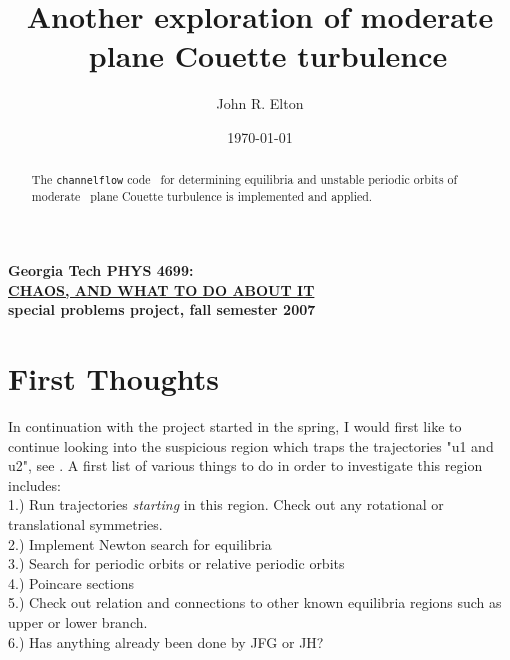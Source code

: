 \documentclass[pre,onecolumn,groupedaddress]{revtex4}
\begin{document}
                \title{
Another exploration of moderate \Reynolds\ plane Couette turbulence
                }\author{
John R. Elton            }
               \date{\today}


                \begin{abstract}
The {\tt channelflow} code~\cite{channelflow} for determining
equilibria and unstable periodic orbits of moderate \Reynolds\ plane
Couette turbulence is implemented and applied.

\end{abstract}
 
                    \maketitle

\noindent
{\bf Georgia Tech PHYS 4699:}\\
\underline{\bf CHAOS, AND WHAT TO DO ABOUT IT }\\
{\bf special problems project, fall semester 2007}


\section{First Thoughts}
In continuation with the project started in the spring, I would
first like to continue looking into the suspicious region which
traps the trajectories "u1 and u2", see . A first list of
various
things to do in order to investigate this region includes: \\
 1.) Run trajectories \emph{starting} in this region. Check out
 any rotational or translational symmetries. \\
 2.) Implement Newton search for equilibria \\
 3.) Search for periodic orbits or relative periodic orbits \\
 4.) Poincare sections \\
 5.) Check out relation and connections to other known equilibria
 regions such as upper or lower branch. \\
 6.) Has anything already been done by JFG or JH? \\
\end{document}
